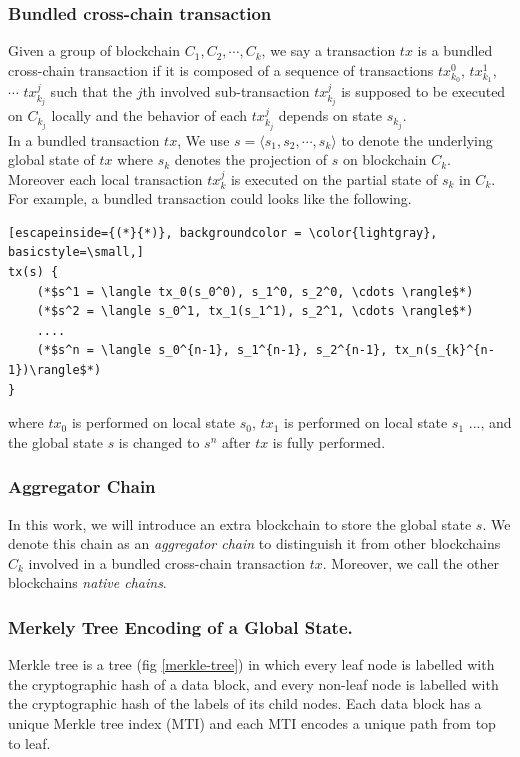 \documentclass[pageno]{jpaper}
\begin{document}
\subsubsection{Bundled cross-chain transaction}
Given a group of blockchain $C_{1}, C_{2}, \cdots, C_{k}$, we say a transaction $tx$ is a bundled cross-chain transaction if it is composed of a sequence of transactions $tx_{k_0}^0$, $tx_{k_1}^1$, $\cdots$ $tx_{k_j}^j$ such that the $j$th involved sub-transaction $tx_{k_j}^j$ is supposed to be executed on $C_{k_j}$ locally and the behavior of each $tx_{k_j}^{j}$ depends on state $s_{k_j}$. \\
\newline
In a bundled transaction $tx$, We use $s= \langle s_1, s_2, \cdots, s_k \rangle$ to denote the underlying global state of $tx$ where $s_k$ denotes the projection of $s$ on blockchain $C_k$. Moreover each local transaction $tx_k^j$ is executed on the partial state of $s_k$ in $C_k$. For example, a bundled transaction could looks like the following. 
\begin{lstlisting}[escapeinside={(*}{*)}, backgroundcolor = \color{lightgray}, basicstyle=\small,]
tx(s) {
    (*$s^1 = \langle tx_0(s_0^0), s_1^0, s_2^0, \cdots \rangle$*)
    (*$s^2 = \langle s_0^1, tx_1(s_1^1), s_2^1, \cdots \rangle$*)
    ....
    (*$s^n = \langle s_0^{n-1}, s_1^{n-1}, s_2^{n-1}, tx_n(s_{k}^{n-1})\rangle$*)
}
\end{lstlisting}
where $tx_0$ is performed on local state $s_0$, $tx_1$ is performed on local state $s_1$ ..., and the global state $s$ is changed to $s^n$ after $tx$ is fully performed.
\\
\subsubsection{Aggregator Chain}
In this work, we will introduce an extra blockchain to store the global state $s$. We denote this chain as an \emph{aggregator chain} to distinguish it from other blockchains $C_{k}$ involved in a bundled cross-chain transaction $tx$. Moreover, we call the other blockchains \emph{native chains}.
\\
\subsubsection{Merkely Tree Encoding of a Global State.}
Merkle tree \cite{becker2008merkle} is a tree (fig \ref{merkle-tree}) in which every leaf node is labelled with the cryptographic hash of a data block, and every non-leaf node is labelled with the cryptographic hash of the labels of its child nodes. Each data block has a unique Merkle tree index (MTI) and each MTI encodes a unique path from top to leaf.\\
\end{document}
